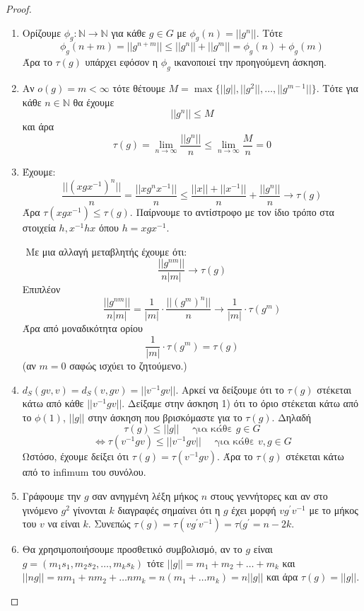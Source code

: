 \documentclass[oneside,a4paper]{article}
\newcommand {\tl}{\textlatin}
\begin{document}
\begin{proof}
	\begin{enumerate}
		\item Ορίζουμε $\phi_g :\mathbb{N}\rightarrow \mathbb{N}$ για κάθε $g \in G$ με $\phi_g(n) = ||g^n||$. Τότε
		$$\phi_g (n+m) = ||g^{n+m}|| \leq ||g^n|| + ||g^m|| = \phi_g(n)+\phi_g(m)$$ Άρα το $\tau(g)$ υπάρχει εφόσον η $\phi_g$ ικανοποιεί την προηγούμενη άσκηση.

		\item Αν $o(g) = m < \infty$ τότε θέτουμε $M = \max \{||g||,||g^2||,\ldots,||g^{m-1}||\}$. Τότε για κάθε $n\in\mathbb N$ θα έχουμε $$||g^n|| \leq M$$ και άρα $$\tau(g) = \lim\limits_{n\rightarrow \infty}\frac{||g^n||}{n} \leq \lim\limits_{n\rightarrow \infty}\frac{M}{n} = 0$$
		
		
		\item Έχουμε: $$\frac{||(xgx^{-1})^n||}{n} = \frac{||xg^nx^{-1}||}{n} \leq \frac{||x|| + ||x^{-1}||}{n} + \frac{||g^n||}{n} \rightarrow \tau(g)$$ Άρα $\tau(xgx^{-1}) \leq \tau(g)$. Παίρνουμε το αντίστροφο με τον ίδιο τρόπο στα στοιχεία $h, x^{-1}hx$ όπου $h = xgx^{-1}$. 
		
		$ $\newline
		Με μια αλλαγή μεταβλητής έχουμε ότι: $$\frac{||g^{nm}||}{n|m|} \longrightarrow \tau(g)$$ Επιπλέον $$\frac{||g^{nm}||}{n|m|} = \frac{1}{|m|} \cdot \frac{||\left(g^m\right)^n||}{n} \longrightarrow \frac{1}{|m|} \cdot \tau(g^m)$$ Άρα από μοναδικότητα ορίου
		$$\frac{1}{|m|} \cdot \tau(g^m) = \tau(g)$$ (αν $m=0$ σαφώς ισχύει το ζητούμενο.)

		\item $d_S(gv,v) = d_S(v,gv) = ||v^{-1}gv||$. Αρκεί να δείξουμε ότι το $\tau(g)$ στέκεται κάτω από κάθε $||v^{-1}gv||$. Δείξαμε στην άσκηση 1) ότι το όριο στέκεται κάτω από το $\phi(1)$, $||g||$ στην άσκηση που βρισκόμαστε για το $\tau(g)$. Δηλαδή $$\tau(g) \leq ||g|| \quad \text{ για κάθε } g \in G$$ 
		$$\iff \tau(v^{-1}gv) \leq ||v^{-1}gv|| \quad \text{ για κάθε } v,g \in G$$ Ωστόσο, έχουμε δείξει ότι $\tau(g) = \tau(v^{-1}gv)$. Άρα το $\tau(g)$ στέκεται κάτω από το \tl{infimum} του συνόλου.
	
		\item Γράφουμε την $g$ σαν ανηγμένη λέξη μήκος $n$ στους γεννήτορες και αν στο γινόμενο $g^2$ γίνονται $k$ διαγραφές σημαίνει ότι η $g$ έχει μορφή $vg^{\prime}v^{-1}$ με το μήκος του $v$ να είναι $k$. Συνεπώς $\tau(g) = \tau(vg^{\prime}v^{-1}) = \tau(g^{\prime} = n-2k$.
		
		\item Θα χρησιμοποιήσουμε προσθετικό συμβολισμό, αν το $g$ είναι $g = (m_1 s_1, m_2 s_2 , \ldots , m_k s_k)$ τότε $||g|| = m_1 + m_2 + \ldots +m_k$ και $||ng|| = nm_1 + nm_2 + \ldots nm_k = n\left(m_1 + \ldots m_k\right) = n||g||$ και άρα $\tau(g) = ||g||$.
	\end{enumerate}
\end{proof}
\end{document}
